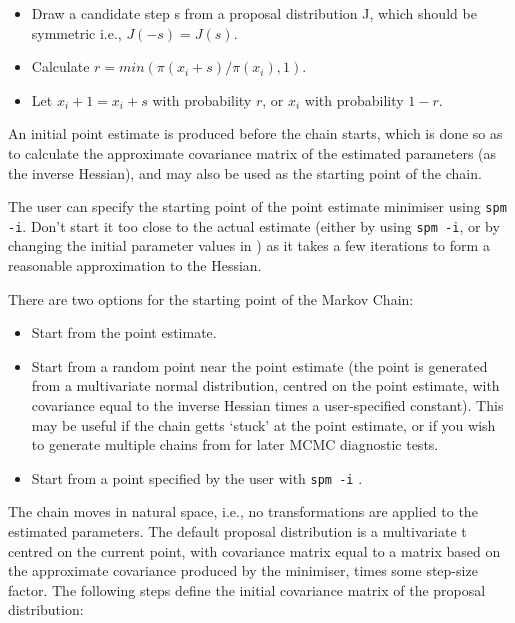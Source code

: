 \begin{itemize}
\item Draw a candidate step s from a proposal distribution J, which should be symmetric i.e., $J(-s)=J(s)$.
\item Calculate $r=min(\pi(x_i+s)/\pi(x_i),1)$. 
\item Let $x_i+1=x_i+s$ with probability $r$, or $x_i$ with probability $1-r$.
\end{itemize}

An initial point estimate is produced before the chain starts, which is done so as to calculate the approximate covariance matrix of the estimated parameters (as the inverse Hessian), and may also be used as the starting point of the chain. 

The user can specify the starting point of the point estimate minimiser using \texttt{spm -i}. Don't start it too close to the actual estimate (either by using \texttt{spm -i}, or by changing the initial parameter values in \config) as it takes a few iterations to form a reasonable approximation to the Hessian. 

There are two options for the starting point of the Markov Chain: 

\begin{itemize}
\item Start from the point estimate.
\item Start from a random point near the point estimate (the point is generated from a multivariate normal distribution, centred on the point estimate, with covariance equal to the inverse Hessian times a user-specified constant). This may be useful if the chain getts `stuck' at the point estimate, or if you wish to generate multiple chains from  for later MCMC diagnostic tests.
\item Start from a point specified by the user with \texttt{spm -i} \NYI.
\end{itemize}

The chain moves in natural space, i.e., no transformations are applied to the estimated parameters. The default proposal distribution is a multivariate t centred on the current point, with covariance matrix equal to a matrix based on the approximate covariance produced by the minimiser, times some step-size factor. The following steps define the initial covariance matrix of the proposal distribution: 

